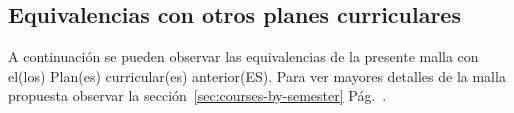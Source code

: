 \begin{landscape}
\chapter{Equivalencias con otros planes curriculares}\label{chap:equivalence}
A continuaci\'on se pueden observar las equivalencias de la presente malla con el(los) Plan(es) curricular(es) anterior(ES). 
Para ver mayores detalles de la malla propuesta observar la sección~\ref{sec:courses-by-semester} P\'ag.~\pageref{sec:courses-by-semester}.


\end{landscape}


